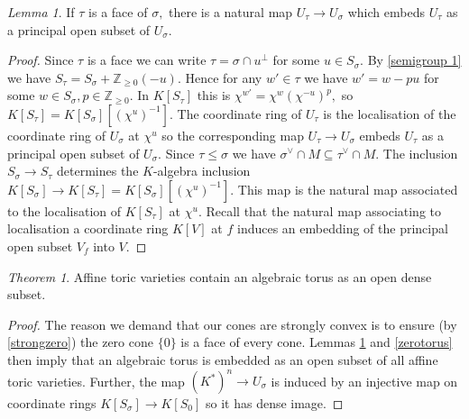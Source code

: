 \documentclass[BSc]{usydthesis}
\numberwithin{equation}{chapter}
\theoremstyle{remark}
\newtheorem{Theorem}[equation]{Theorem}
\newtheorem{Lemma}[equation]{Lemma}
\newcommand{\Z}{\mathbb{Z}}
\newcommand{\V}{\vee}
\begin{document}
\begin{Lemma}\label{faceopen} If $\tau$ is a face of $\sigma,$ there is a natural map $U_{\tau} \to U_{\sigma}$ which embeds $U_{\tau}$ as a principal open subset of $U_{\sigma}.$ 
\end{Lemma}

\begin{proof} Since $\tau$ is a face we can write $\tau = \sigma \cap u^{\perp}$ for some $u\in S_{\sigma}.$ By \ref{semigroup 1} we have $S_{\tau} = S_{\sigma} + \Z_{\geq 0} (-u).$ Hence for any $w'\in \tau$ we have $w' = w-pu$ for some $w\in S_{\sigma}, p\in \Z_{\geq 0}.$ In $K[S_{\tau}]$ this is $\chi^{w'} = \chi^w (\chi^{-u})^p,$ so $K[S_{\tau}] = K[S_{\sigma}][(\chi^u)^{-1}].$ The coordinate ring of $U_{\tau}$ is the localisation  of the coordinate ring of $U_{\sigma}$ at $\chi^u$ so the corresponding map $U_{\tau} \to U_{\sigma}$ embeds $U_{\tau}$ as a principal open subset of $U_{\sigma}.$
Since $\tau\leq \sigma$ we have $\sigma^{\V} \cap M \subseteq \tau^{\V} \cap M.$ The inclusion $S_{\sigma} \to S_{\tau}$ determines the $K$-algebra inclusion $K[S_{\sigma}] \to K[S_{\tau}]=K[S_{\sigma}][(\chi^u)^{-1}].$ This map is the natural map associated to the localisation of $K[S_{\tau}]$ at $\chi^u.$ Recall that the natural map associating to localisation a coordinate ring $K[V]$ at $f$ induces an embedding of the principal open subset $V_f$ into $V.$ 
\end{proof} 

\begin{Theorem}\label{torusdenseaffine}
Affine toric varieties contain an algebraic torus as an open dense subset.
\end{Theorem}
\begin{proof} The reason we demand that our cones are strongly convex is to ensure (by \ref{strongzero}) the zero cone $\{ 0\}$ is a face of every cone. Lemmas \ref{faceopen} and \ref{zerotorus} then imply that an algebraic torus is embedded as an open subset of all affine toric varieties. Further, the map $(K^*)^n \to U_{\sigma}$ is induced by an injective map on coordinate rings $K[S_{\sigma}] \to K[S_{0}]$ so it has dense image.
\end{proof}
\end{document}
